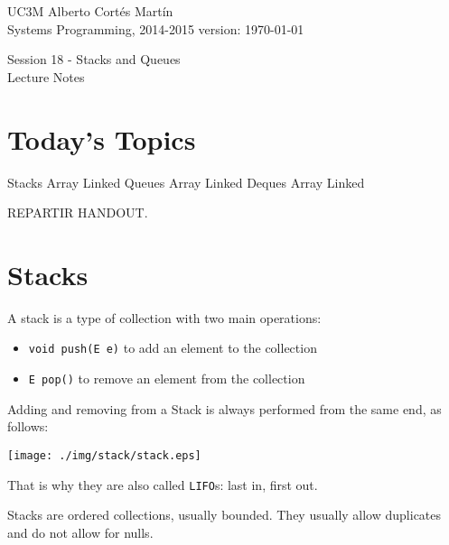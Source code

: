 \documentclass[a4paper, 9pt]{extarticle}
\newcommand{\realtitle}{Session 18 - Stacks and Queues}
\begin{document}
\makebox[\linewidth]{\rule{\textwidth}{0.4pt}}
UC3M \hfill Alberto Cortés Martín\\
Systems Programming, 2014-2015 \hfill version: \today\\
\makebox[\linewidth]{\rule{\textwidth}{0.4pt}}
\begin{center}
  \Large{\realtitle}\\Lecture Notes
\end{center}
\makebox[\linewidth]{\rule{\textwidth}{0.4pt}}
\vspace{1cm}


\section{Today's Topics}
\begin{blackboard}
Stacks
  Array
  Linked
Queues
  Array
  Linked
Deques
  Array
  Linked
\end{blackboard}

REPARTIR HANDOUT.

\section{Stacks}

A stack is a type of collection with two main operations:

\begin{itemize}

  \item \verb+void push(E e)+ to add an element to the collection

  \item \verb+E pop()+ to remove an element from the collection

\end{itemize}

Adding and removing from a Stack is always performed from the same end, as
follows:

\begin{center}
  \texttt{[image: ./img/stack/stack.eps]}
\end{center}

That is why they are also called \verb+LIFO+s: last in, first out.

Stacks are ordered collections, usually bounded. They usually allow duplicates
and do not allow for nulls.

\end{document}
